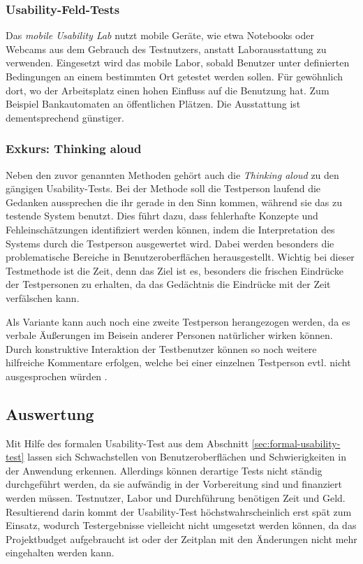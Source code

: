 \subsubsection{Usability-Feld-Tests}

Das \textit{mobile Usability Lab} nutzt mobile Geräte, wie etwa Notebooks oder Webcams aus dem Gebrauch des Testnutzers, anstatt Laborausstattung zu verwenden. 
Eingesetzt wird das mobile Labor, sobald Benutzer unter definierten Bedingungen an einem bestimmten Ort getestet werden sollen. 
Für gewöhnlich dort, wo der Arbeitsplatz einen hohen Einfluss auf die Benutzung hat. 
Zum Beispiel Bankautomaten an öffentlichen Plätzen. 
Die Ausstattung ist dementsprechend günstiger. \cite[vgl.][93\psq]{usabilityEngineeringKompakt}

\subsubsection{Exkurs: Thinking aloud\label{sec:thinking_aloud}}
Neben den zuvor genannten Methoden gehört auch die \emph{Thinking aloud} zu den gängigen Usability-Tests.
Bei der Methode soll die Testperson laufend die Gedanken aussprechen die ihr gerade in den Sinn kommen, während sie das zu testende System benutzt.
Dies führt dazu, dass fehlerhafte Konzepte und Fehleinschätzungen identifiziert werden können, indem die Interpretation des Systems durch die Testperson ausgewertet wird.
Dabei werden besonders die problematische Bereiche in Benutzeroberflächen herausgestellt.
Wichtig bei dieser Testmethode ist die Zeit, denn das Ziel ist es, besonders die frischen Eindrücke der Testpersonen zu erhalten, da das Gedächtnis die Eindrücke mit der Zeit verfälschen kann.

Als Variante kann auch noch eine zweite Testperson herangezogen werden, da es verbale Äußerungen im Beisein anderer Personen natürlicher wirken können.
Durch konstruktive Interaktion der Testbenutzer können so noch weitere hilfreiche Kommentare erfolgen, welche bei einer einzelnen Testperson evtl. nicht ausgesprochen würden \cite[vgl.][73\psq]{usability_engineering_software_developers}.

\subsection{Auswertung}

Mit Hilfe des formalen Usability-Test aus dem Abschnitt \ref{sec:formal-usability-test} lassen sich Schwachstellen von Benutzeroberflächen und Schwierigkeiten in der Anwendung erkennen.
Allerdings können derartige Tests nicht ständig durchgeführt werden, da sie aufwändig in der Vorbereitung sind und finanziert werden müssen. 
Testnutzer, Labor und Durchführung benötigen Zeit und Geld. 
Resultierend darin kommt der Usability-Test höchstwahrscheinlich erst spät zum Einsatz, wodurch Testergebnisse vielleicht nicht umgesetzt werden können, da das Projektbudget aufgebraucht ist oder der Zeitplan mit den Änderungen nicht mehr eingehalten werden kann. 


